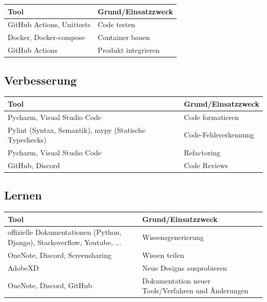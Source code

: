\documentclass[a4paper,11pt]{scrartcl}
\begin{document}
\begin{table}[H]
\begin{center}
\begin{tabular}{|p{4cm}|p{8cm}|}
\hline
\textbf{Tool} &\textbf{Grund/Einsatzzweck} \\ \hline
GitHub Actions, Unittests & Code testen \\ \hline
Docker, Docker-compose & Container bauen\\ \hline
GitHub Actions & Produkt integrieren\\ \hline
\end{tabular}
\end{center}
\end{table}
 
\subsection{Verbesserung}

\begin{table}[H]
\begin{center}
\begin{tabular}{|p{4cm}|p{8cm}|}
\hline
\textbf{Tool} &\textbf{Grund/Einsatzzweck} \\ \hline
Pycharm, Visual Studio Code & Code formatieren\\ \hline
Pylint (Syntax, Semantik), mypy (Statische Typechecks) &  Code-Fehlererkennung\\ \hline
Pycharm, Visual Studio Code & Refactoring\\ \hline
GitHub, Discord & Code Reviews\\ \hline
\end{tabular}
\end{center}
\end{table}

\subsection{Lernen}

\begin{table}[H]
\begin{center}
\begin{tabular}{|p{4cm}|p{8cm}|}
\hline
\textbf{Tool} &\textbf{Grund/Einsatzzweck} \\ \hline
offizielle Dokumentationen (Python, Django), Stackoverflow, Youtube, ... & Wissensgenerierung\\ \hline
OneNote, Discord, Screensharing & Wissen teilen\\ \hline
AdobeXD & Neue Designs ausprobieren\\ \hline
OneNote, Discord, GitHub & Dokumentation neuer Tools/Verfahren und Änderungen\\ \hline
\end{tabular}
\end{center}
\end{table}
\end{document}
